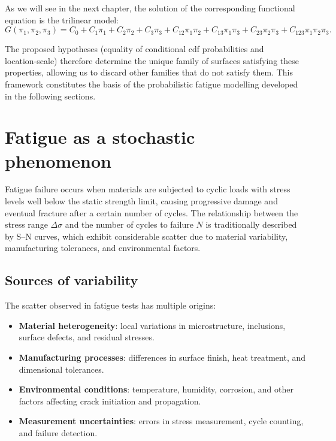 As we will see in the next chapter, the solution of the corresponding functional equation is the trilinear model:
\begin{equation}\label{eq:2Dfatiguemodel}
G(\pi_1,\pi_2,\pi_3) = C_0 + C_1\pi_1 + C_2\pi_2 + C_3\pi_3
+ C_{12}\pi_1\pi_2 + C_{13}\pi_1\pi_3 + C_{23}\pi_2\pi_3
+ C_{123}\pi_1\pi_2\pi_3.
\end{equation}

The proposed hypotheses (equality of conditional cdf probabilities and location‑scale) therefore determine the unique family of surfaces satisfying these properties, allowing us to discard other families that do not satisfy them. This framework constitutes the basis of the probabilistic fatigue modelling developed in the following sections.

\section{Fatigue as a stochastic phenomenon}
\label{sec:fatiga_estocastica}

Fatigue failure occurs when materials are subjected to cyclic loads with stress levels well below the static strength limit, causing progressive damage and eventual fracture after a certain number of cycles. The relationship between the stress range $\Delta\sigma$ and the number of cycles to failure $N$ is traditionally described by S–N curves, which exhibit considerable scatter due to material variability, manufacturing tolerances, and environmental factors.

\subsection{Sources of variability}

The scatter observed in fatigue tests has multiple origins:

\begin{itemize}
    \item \textbf{Material heterogeneity}: local variations in microstructure, inclusions, surface defects, and residual stresses.
    \item \textbf{Manufacturing processes}: differences in surface finish, heat treatment, and dimensional tolerances.
    \item \textbf{Environmental conditions}: temperature, humidity, corrosion, and other factors affecting crack initiation and propagation.
    \item \textbf{Measurement uncertainties}: errors in stress measurement, cycle counting, and failure detection.
\end{itemize}

